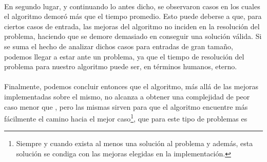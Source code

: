 \paragraph{}
En segundo lugar, y continuando lo antes dicho, se observaron casos en los cuales el algoritmo demoró más que el tiempo promedio. Esto puede deberse a que, para ciertos casos de entrada, las mejoras del algoritmo no inciden en la resolución del problema, haciendo que se demore demasiado en conseguir una solución válida. Si se suma el hecho de analizar dichos casos para entradas de gran tamaño, podemos llegar a estar ante un problema, ya que el tiempo de resolución del problema para nuestro algoritmo puede ser, en términos humanos, eterno.

\paragraph{}
Finalmente, podemos concluir entonces que el algoritmo, más allá de las mejoras implementadas sobre el mismo, no alcanza a obtener una complejidad de peor caso menor que , pero las mismas sirven para que el algoritmo encuentre más fácilmente el camino hacia el mejor caso\footnote{Siempre y cuando exista al menos una solución al problema y además, esta solución se condiga con las mejoras elegidas en la implementación.}, que para este tipo de problemas es 

